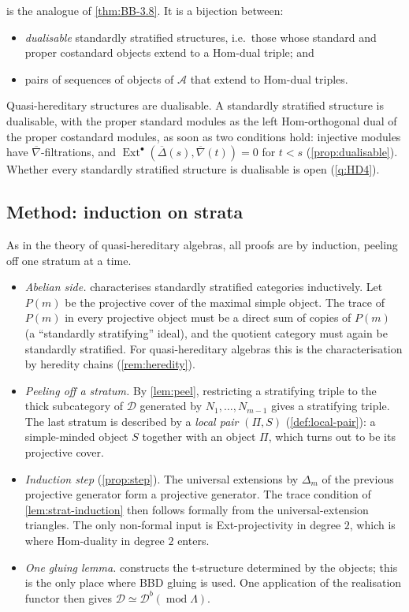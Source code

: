 \documentclass[11pt,reqno]{amsart}
\theoremstyle{plain}
\theoremstyle{definition}
\theoremstyle{remark}
\DeclareMathOperator{\Ext}{Ext}
\newcommand{\modd}{\operatorname{mod}}
\newcommand{\Db}{\mathcal{D}^b}
\newcommand{\nablabar}{\overline{\nabla}}
\newcommand{\Deltabar}{\overline{\Delta}}
\newcommand{\cD}{\mathcal{D}}
\newcommand{\cA}{\mathcal{A}}
\begin{document}
 is the analogue of \cref{thm:BB-3.8}. It is a bijection between:
\begin{itemize}
\item \emph{dualisable} standardly stratified structures, i.e.\ those whose standard and proper costandard objects extend to a Hom-dual triple; and
\item pairs of sequences of objects of $\cA$ that extend to Hom-dual triples.
\end{itemize}
Quasi-hereditary structures are dualisable. A standardly stratified structure is dualisable, with the proper standard modules as the left Hom-orthogonal dual of the proper costandard modules, as soon as two conditions hold: injective modules have $\nablabar$-filtrations, and $\Ext^\bullet(\Deltabar(s),\nablabar(t))=0$ for $t<s$ (\cref{prop:dualisable}). Whether every standardly stratified structure is dualisable is open (\cref{q:HD4}).

\subsection{Method: induction on strata}
As in the theory of quasi-hereditary algebras, all proofs are by induction, peeling off one stratum at a time.
\begin{itemize}
\item \emph{Abelian side.}  characterises standardly stratified categories inductively. Let $P(m)$ be the projective cover of the maximal simple object. The trace of $P(m)$ in every projective object must be a direct sum of copies of $P(m)$ (a ``standardly stratifying'' ideal), and the quotient category must again be standardly stratified. For quasi-hereditary algebras this is the characterisation by heredity chains (\cref{rem:heredity}).
\item \emph{Peeling off a stratum.} By \cref{lem:peel}, restricting a stratifying triple to the thick subcategory of $\cD$ generated by $N_1,\dots,N_{m-1}$ gives a stratifying triple. The last stratum is described by a \emph{local pair} $(\Pi,S)$ (\cref{def:local-pair}): a simple-minded object $S$ together with an object $\Pi$, which turns out to be its projective cover.
\item \emph{Induction step} (\cref{prop:step}). The universal extensions by $\Delta_m$ of the previous projective generator form a projective generator. The trace condition of \cref{lem:strat-induction} then follows formally from the universal-extension triangles. The only non-formal input is Ext-projectivity in degree $2$, which is where Hom-duality in degree $2$ enters.
\item \emph{One gluing lemma.}  constructs the t-structure determined by the objects; this is the only place where BBD gluing is used. One application of the realisation functor then gives $\cD\simeq\Db(\modd\Lambda)$.
\end{itemize}
\end{document}
